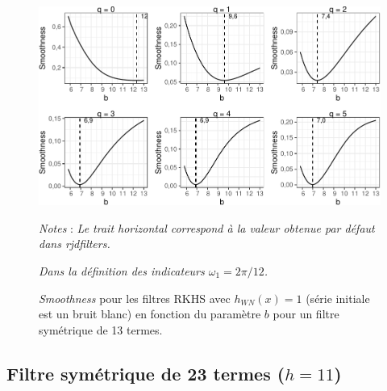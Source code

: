 \documentclass[
  11pt,
  french,
  a4paper]{article}
\newcommand\1{\mathds{1}}
\begin{document}
\begin{figure}[H]

{\centering \includegraphics{img/bookdown/pdf/rkhsoptismoothness6wn-1} 

}

\caption[\emph{Smoothness} pour les filtres RKHS avec \(h_{WN}(x)=1\) (série initiale est un bruit blanc) en fonction du paramètre \(b\) pour un filtre symétrique de 13 termes]{\emph{Smoothness} pour les filtres RKHS avec \(h_{WN}(x)=1\) (série initiale est un bruit blanc) en fonction du paramètre \(b\) pour un filtre symétrique de 13 termes.}\label{fig:rkhsoptismoothness6wn}

\footnotesize


\emph{Notes} : \emph{Le trait horizontal correspond à la valeur obtenue par défaut dans rjdfilters.}

\emph{Dans la définition des indicateurs \(\omega_1=2\pi/12\).}
\normalsize\end{figure}

\newpage

\hypertarget{filtre-symuxe9trique-de-23-termes-h11}{%
\subsection{\texorpdfstring{Filtre symétrique de 23 termes (\(h=11\))}{Filtre symétrique de 23 termes (h=11)}}\label{filtre-symuxe9trique-de-23-termes-h11}}
\end{document}
